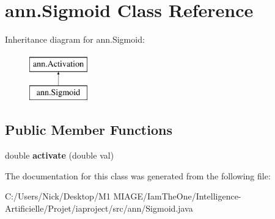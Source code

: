 \hypertarget{classann_1_1_sigmoid}{}\section{ann.\+Sigmoid Class Reference}
\label{classann_1_1_sigmoid}
Inheritance diagram for ann.\+Sigmoid\+:\begin{figure}[H]
\begin{center}
\leavevmode
\includegraphics[height=2.000000cm]{classann_1_1_sigmoid}
\end{center}
\end{figure}
\subsection*{Public Member Functions}
\begin{DoxyCompactItemize}
\item 
\mbox{\label{classann_1_1_sigmoid_a494474439cd325dce73298bebf90d196}} 
double {\bfseries activate} (double val)
\end{DoxyCompactItemize}


The documentation for this class was generated from the following file\+:\begin{DoxyCompactItemize}
\item 
C\+:/\+Users/\+Nick/\+Desktop/\+M1 M\+I\+A\+G\+E/\+Iam\+The\+One/\+Intelligence-\/\+Artificielle/\+Projet/iaproject/src/ann/Sigmoid.\+java\end{DoxyCompactItemize}
